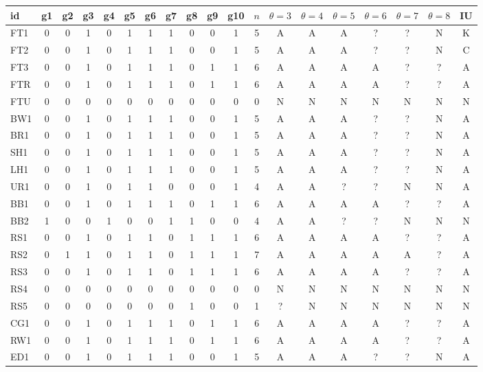 {\scriptsize
\begin{longtable}{@{}lcccccccccccccccccc@{}}
id & g1 & g2 & g3 & g4 & g5 & g6 & g7 & g8 & g9 & g10 & $n$ & $\theta{=}3$ & $\theta{=}4$ & $\theta{=}5$ & $\theta{=}6$ & $\theta{=}7$ & $\theta{=}8$ & IU \\ \midrule\endhead
FT1 & 0 & 0 & 1 & 0 & 1 & 1 & 1 & 0 & 0 & 1 & 5 & A & A & A & ? & ? & N & K \\
FT2 & 0 & 0 & 1 & 0 & 1 & 1 & 1 & 0 & 0 & 1 & 5 & A & A & A & ? & ? & N & C \\
FT3 & 0 & 0 & 1 & 0 & 1 & 1 & 1 & 0 & 1 & 1 & 6 & A & A & A & A & ? & ? & A \\
FTR & 0 & 0 & 1 & 0 & 1 & 1 & 1 & 0 & 1 & 1 & 6 & A & A & A & A & ? & ? & A \\
FTU & 0 & 0 & 0 & 0 & 0 & 0 & 0 & 0 & 0 & 0 & 0 & N & N & N & N & N & N & N \\
BW1 & 0 & 0 & 1 & 0 & 1 & 1 & 1 & 0 & 0 & 1 & 5 & A & A & A & ? & ? & N & A \\
BR1 & 0 & 0 & 1 & 0 & 1 & 1 & 1 & 0 & 0 & 1 & 5 & A & A & A & ? & ? & N & A \\
SH1 & 0 & 0 & 1 & 0 & 1 & 1 & 1 & 0 & 0 & 1 & 5 & A & A & A & ? & ? & N & A \\
LH1 & 0 & 0 & 1 & 0 & 1 & 1 & 1 & 0 & 0 & 1 & 5 & A & A & A & ? & ? & N & A \\
UR1 & 0 & 0 & 1 & 0 & 1 & 1 & 0 & 0 & 0 & 1 & 4 & A & A & ? & ? & N & N & A \\
BB1 & 0 & 0 & 1 & 0 & 1 & 1 & 1 & 0 & 1 & 1 & 6 & A & A & A & A & ? & ? & A \\
BB2 & 1 & 0 & 0 & 1 & 0 & 0 & 1 & 1 & 0 & 0 & 4 & A & A & ? & ? & N & N & N \\
RS1 & 0 & 0 & 1 & 0 & 1 & 1 & 0 & 1 & 1 & 1 & 6 & A & A & A & A & ? & ? & A \\
RS2 & 0 & 1 & 1 & 0 & 1 & 1 & 0 & 1 & 1 & 1 & 7 & A & A & A & A & A & ? & A \\
RS3 & 0 & 0 & 1 & 0 & 1 & 1 & 0 & 1 & 1 & 1 & 6 & A & A & A & A & ? & ? & A \\
RS4 & 0 & 0 & 0 & 0 & 0 & 0 & 0 & 0 & 0 & 0 & 0 & N & N & N & N & N & N & N \\
RS5 & 0 & 0 & 0 & 0 & 0 & 0 & 0 & 1 & 0 & 0 & 1 & ? & N & N & N & N & N & N \\
CG1 & 0 & 0 & 1 & 0 & 1 & 1 & 1 & 0 & 1 & 1 & 6 & A & A & A & A & ? & ? & A \\
RW1 & 0 & 0 & 1 & 0 & 1 & 1 & 1 & 0 & 1 & 1 & 6 & A & A & A & A & ? & ? & A \\
ED1 & 0 & 0 & 1 & 0 & 1 & 1 & 1 & 0 & 0 & 1 & 5 & A & A & A & ? & ? & N & A \\

\end{longtable}}
